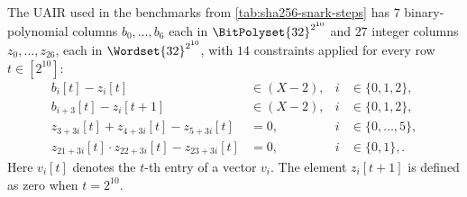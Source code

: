 The UAIR used in the benchmarks from \cref{tab:sha256-snark-steps}  has $7$ binary-polynomial columns $b_0,\dots,b_6$ each in  $\BitPolyset{32}^{2^{10}}$ and $27$ integer columns
$z_0,\dots,z_{26}$, each in $\Wordset{32}^{2^{10}}$, with $14$ constraints applied for every row $t\in [2^{10}]$:
%
\begin{align}
  b_i[t] - z_i[t] &\in (X{-}2), & i &\in \{0,1,2\}, \tag{3 deg-1}\\
  b_{i+3}[t] - z_i[t+1] &\in (X{-}2), & i &\in \{0,1,2\}, \tag{3 deg-1}\\
  z_{3+3i}[t] + z_{4+3i}[t] - z_{5+3i}[t] &= 0, & i &\in \{0,\dots,5\}, \tag{6 deg-1}\\
  z_{21+3i}[t]\cdot z_{22+3i}[t] - z_{23+3i}[t] &= 0, & i &\in \{0,1\}, \tag{2 deg-2}.
\end{align}
%
Here $v_i[t]$ denotes the $t$-th entry of a vector $v_i$. The element $z_i[t+1]$ is defined as zero when $t=2^{10}$. 


